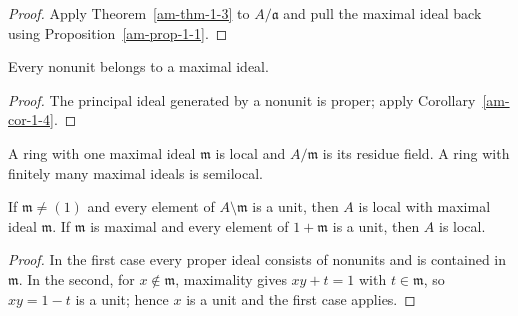\begin{proof}
Apply Theorem~\ref{am-thm-1-3} to $A/\mathfrak{a}$ and pull the maximal ideal back
using Proposition~\ref{am-prop-1-1}.
\end{proof}
\begin{corollary}
\label{am-cor-1-5}
\uses{}
Every nonunit belongs to a maximal ideal.
\end{corollary}
\begin{proof}
The principal ideal generated by a nonunit is proper; apply Corollary~\ref{am-cor-1-4}.
\end{proof}
\begin{definition}
\label{am-def-local-ring}
\uses{}
A ring with one maximal ideal $\mathfrak{m}$ is local and $A/\mathfrak{m}$ is its residue field.  A
ring with finitely many maximal ideals is semilocal.
\end{definition}
\begin{proposition}
\label{am-prop-1-6}
\uses{}
If $\mathfrak{m}\ne(1)$ and every element of $A\setminus\mathfrak{m}$ is a unit, then $A$ is local
with maximal ideal $\mathfrak{m}$.  If $\mathfrak{m}$ is maximal and every element of $1+\mathfrak{m}$ is a
unit, then $A$ is local.
\end{proposition}
\begin{proof}
In the first case every proper ideal consists of nonunits and is contained in
$\mathfrak{m}$.  In the second, for $x\notin\mathfrak{m}$, maximality gives
$xy+t=1$ with $t\in\mathfrak{m}$, so $xy=1-t$ is a unit; hence $x$ is a unit
and the first case applies.
\end{proof}


